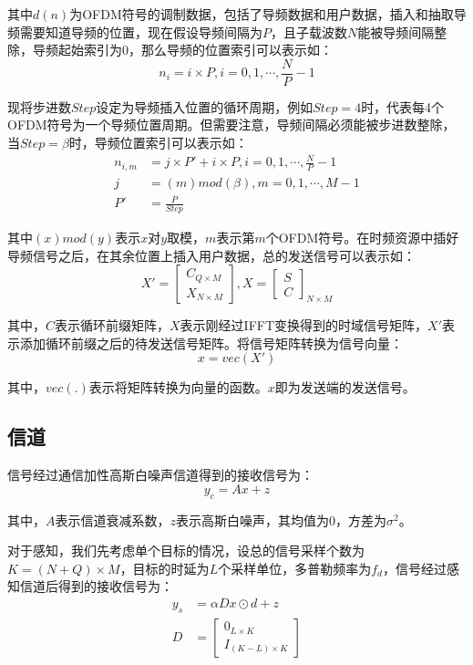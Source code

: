 \documentclass[12pt, a4paper, oneside]{ctexart}
\begin{document}
其中$d(n)$为OFDM符号的调制数据，包括了导频数据和用户数据，插入和抽取导频需要知道导频的位置，现在假设导频间隔为$P$，且子载波数$N$能被导频间隔整除，导频起始索引为0，那么导频的位置索引可以表示如：
\[
    n_i = i\times P,i=0,1,\cdots,\frac{N}{P}-1
\]

现将步进数$Step$设定为导频插入位置的循环周期，例如$Step=4$时，代表每4个OFDM符号为一个导频位置周期。但需要注意，导频间隔必须能被步进数整除，当$Step=\beta$时，导频位置索引可以表示如：
\begin{align}
    n_{i,m}&=j\times P'+i\times P,i=0,1,\cdots,\frac{N}{P}-1 \\
    j&=(m)mod(\beta),m=0,1,\cdots,M-1 \\
    P'&=\frac{P}{Step}
\end{align}

其中$(x)mod(y)$表示$x$对$y$取模，$m$表示第$m$个OFDM符号。在时频资源中插好导频信号之后，在其余位置上插入用户数据，总的发送信号可以表示如：
$$
X'=\begin{bmatrix}
    C_{Q\times M} \\
    X_{N\times M}
\end{bmatrix},X=\begin{bmatrix}
    S \\
    C
\end{bmatrix}_{N\times M}
$$

其中，$C$表示循环前缀矩阵，$X$表示刚经过IFFT变换得到的时域信号矩阵，$X'$表示添加循环前缀之后的待发送信号矩阵。将信号矩阵转换为信号向量：
$$
x=vec(X')
$$

其中，$vec(.)$表示将矩阵转换为向量的函数。$x$即为发送端的发送信号。
\subsection*{\heiti{} 信道}
信号经过通信加性高斯白噪声信道得到的接收信号为：
$$
y_c=Ax+z
$$

其中，$A$表示信道衰减系数，$z$表示高斯白噪声，其均值为0，方差为$\sigma^2$。

对于感知，我们先考虑单个目标的情况，设总的信号采样个数为$K=(N+Q)\times M$，目标的时延为$L$个采样单位，多普勒频率为$f_d$，信号经过感知信道后得到的接收信号为：
$$
\begin{align}
y_s&=\alpha Dx\odot d+z \\
D&=\begin{bmatrix}
    0_{L\times K} \\
    I_{(K-L)\times K}
\end{bmatrix}
\end{align}
$$
\end{document}
